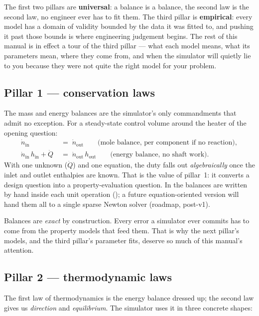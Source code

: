 \documentclass[11pt,a4paper]{article}
\begin{document}
The first two pillars are \textbf{universal}: a balance is a balance,
the second law is the second law, no engineer ever has to fit them.
The third pillar is \textbf{empirical}: every model has a domain of
validity bounded by the data it was fitted to, and pushing it past
those bounds is where engineering judgement begins.  The rest of
this manual is in effect a tour of the third pillar --- what each
model means, what its parameters mean, where they come from, and
when the simulator will quietly lie to you because they were not
quite the right model for your problem.

\subsection{Pillar 1 --- conservation laws}

The mass and energy balances are the simulator's only commandments
that admit no exception.  For a steady-state control volume around
the heater of the opening question:
\begin{align}
   \dot n_{\mathrm{in}} &\;=\; \dot n_{\mathrm{out}}
     \qquad \text{(mole balance, per component if no reaction)}, \\
   \dot n_{\mathrm{in}}\,h_{\mathrm{in}} + \dot Q
     &\;=\; \dot n_{\mathrm{out}}\,h_{\mathrm{out}}
     \qquad \text{(energy balance, no shaft work)}.
\end{align}
With one unknown ($\dot Q$) and one equation, the duty falls out
\emph{algebraically} once the inlet and outlet enthalpies are known.
That is the value of pillar~1: it converts a design question into a
property-evaluation question.  In the balances are written by
hand inside each unit operation
(); a future equation-oriented version
will hand them all to a single sparse Newton solver
(roadmap, post-v1).

\begin{intuition}
Balances are \emph{exact} by construction.  Every error a simulator
ever commits has to come from the property models that feed them.
That is why the next pillar's models, and the third pillar's
parameter fits, deserve so much of this manual's attention.
\end{intuition}

\subsection{Pillar 2 --- thermodynamic laws}

The first law of thermodynamics is the energy balance dressed up;
the second law gives us \emph{direction} and \emph{equilibrium}.
The simulator uses it in three concrete shapes:
\end{document}
